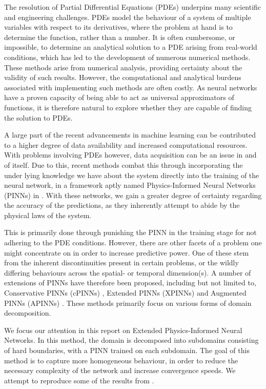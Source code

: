 The resolution of Partial Differential Equations (PDEs) underpins many scientific and engineering challenges.
PDEs model the behaviour of a system of multiple variables with respect to its derivatives, where the problem at hand is to determine the function, rather than a number.
It is often cumbersome, or impossible, to determine an analytical solution to a PDE arising from real-world conditions, which has led to the development of numerous numerical methods.
These methods arise from numerical analysis, providing certainty about the validity of such results.
However, the computational and analytical burdens associated with implementing such methods are often costly.
As neural networks have a proven capacity of being able to act as universal approximators of functions, it is therefore natural to explore whether they are capable of finding the solution to PDEs.

A large part of the recent advancements in machine learning can be contributed to a higher degree of data availability and increased computational resources.
With problems involving PDEs however, data acquisition can be an issue in and of itself.
Due to this, recent methods combat this through incorporating the under lying knowledge we have about the system directly into the training of the neural network, in a framework aptly named Physics-Informed Neural Networks (PINNs) in \textcite{RAISSI2019686}.
With these networks, we gain a greater degree of certainty regarding the accuracy of the predictions, as they inherently attempt to abide by the physical laws of the system.

This is primarily done through punishing the PINN in the training stage for not adhering to the PDE conditions.
However, there are other facets of a problem one might concentrate on in order to increase predictive power.
One of these stem from the inherent discontinuities present in certain problems, or the wildly differing behaviours across the spatial- or temporal dimension(s).
A number of extensions of PINNs have therefore been proposed, including but not limited to, Conservative PINNs (cPINNs) \cite{2020CMAME.36513028J}, Extended PINNs (XPINNs) \cite{Jagtap2020ExtendedPN} and Augmented PINNs (APINNs) \cite{Hu_2023}.
These methods primarily focus on various forms of domain decomposition.

We focus our attention in this report on Extended Physics-Informed Neural Networks.
In this method, the domain is decomposed into subdomains consisting of hard boundaries, with a PINN trained on each subdomain.
The goal of this method is to capture more homogeneous behaviour, in order to reduce the necessary complexity of the network and increase convergence speeds.
We attempt to reproduce some of the results from \textcite{XPINN_generalize}.

